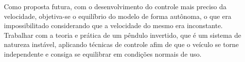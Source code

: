 \documentclass[conference,harvard,brazil,english]{sbatex}
\begin{document}
    Como proposta futura, com o desenvolvimento do controle mais preciso da velocidade, objetiva-se o equilíbrio do modelo de forma autônoma, o que era impossibilitado considerando que a velocidade do mesmo era inconstante.
    Trabalhar com a teoria e prática de um pêndulo invertido, que é um sistema de natureza instável, aplicando técnicas de controle afim de que o veículo se torne independente e consiga se equilibrar em condições normais de uso.
    
    
    
    
\end{document}
